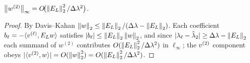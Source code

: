 \begin{lemma}\label{lem:C-remainder}
$\norm{w^{(2)}}_\infty=O\!\bigl(\opnorm{\EL}^2/\Dlam^2\bigr)$.
\end{lemma}
\begin{proof}
By Davis--Kahan $\norm{w}_2\le\opnorm{\EL}/(\Dlam-\opnorm{\EL})$. Each coefficient
$b_\ell=-\langle v^{(\ell)},\EL w\rangle$ satisfies $|b_\ell|\le\opnorm{\EL}\norm{w}_2$,
and since $|\lambda_\ell-\hat\lambda_2|\ge\Dlam-\opnorm{\EL}$ each summand of
$w^{(2)}$ contributes $O(\opnorm{\EL}^2/\Dlam^2)$ in $\ell_\infty$; the $\vv$
component obeys $|\langle\vv,w\rangle|=O(\norm{w}_2^2)=O(\opnorm{\EL}^2/\Dlam^2)$.
\end{proof}
